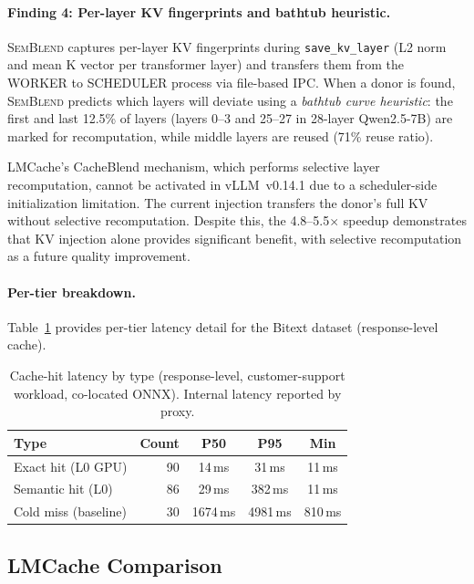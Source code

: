 \documentclass[11pt,twocolumn]{article}
\newcommand{\semblend}{\textsc{SemBlend}\xspace}
\begin{document}
\paragraph{Finding 4: Per-layer KV fingerprints and bathtub heuristic.}
\semblend captures per-layer KV fingerprints during \texttt{save\_kv\_layer}
(L2 norm and mean K vector per transformer layer) and transfers them
from the WORKER to SCHEDULER process via file-based IPC. When a donor
is found, \semblend predicts which layers will deviate using a
\emph{bathtub curve heuristic}: the first and last 12.5\% of layers
(layers 0--3 and 25--27 in 28-layer Qwen2.5-7B) are marked for
recomputation, while middle layers are reused (71\% reuse ratio).

LMCache's CacheBlend mechanism, which performs selective layer
recomputation, cannot be activated in vLLM~v0.14.1 due to a
scheduler-side initialization limitation. The current injection
transfers the donor's full KV without selective recomputation.
Despite this, the 4.8--5.5$\times$ speedup demonstrates that
KV injection alone provides significant benefit, with selective
recomputation as a future quality improvement.


\paragraph{Per-tier breakdown.} Table~\ref{tab:tier-detail} provides
per-tier latency detail for the Bitext dataset (response-level cache).

\begin{table}[t]
\centering
\caption{Cache-hit latency by type (response-level, customer-support
workload, co-located ONNX). Internal latency reported by proxy.}
\label{tab:tier-detail}
\footnotesize
\setlength{\tabcolsep}{3pt}
\begin{tabular}{lrccc}
\toprule
\textbf{Type} & \textbf{Count} & \textbf{P50} & \textbf{P95} & \textbf{Min} \\
\midrule
Exact hit (L0 GPU) & 90  & 14\,ms  & 31\,ms  & 11\,ms \\
Semantic hit (L0)   & 86  & 29\,ms  & 382\,ms & 11\,ms \\
\midrule
Cold miss (baseline)& 30  & 1674\,ms & 4981\,ms & 810\,ms \\
\bottomrule
\end{tabular}
\end{table}


\subsection{LMCache Comparison}
\label{sec:lmcache-comparison}
\end{document}
